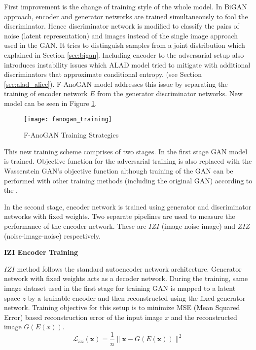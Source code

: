 First improvement is the change of training style of the whole model. In BiGAN approach,
encoder and generator networks are trained simultaneously to fool the discriminator. 
Hence discriminator network is
modified to classify the pairs of noise (latent representation) and images instead of the single
image approach used in the GAN. It tries to distinguish samples from a joint
distribution which explained in Section \ref{sec:bigan}. Including encoder to the adversarial setup
also introduces instability issues which ALAD model \cite{DBLP:journals/corr/abs-1812-02288}
tried to mitigate with additional discriminators that approximate conditional entropy. (see Section
\ref{sec:alad_alice}). F-AnoGAN model addresses this issue by separating the training of
encoder network $E$ from the generator discriminator networks. New model can be seen in Figure
\ref{fig:fanogan_training}. 
\begin{figure}[h!]
	\centering
	\texttt{[image: fanogan\_training]}
	\caption{F-AnoGAN Training Strategies \cite{pub.1111824956}}
	\label{fig:fanogan_training}
\end{figure}

This new training scheme comprises of two stages. In the first stage GAN model is trained.
Objective function for the adversarial training is also replaced with the Wasserstein GAN's
objective function \cite{Arjovsky2017WassersteinG} 
although training of the GAN can be performed with other training methods (including the
original GAN) according to the \cite{pub.1111824956}.

In the second stage, encoder network is trained using generator and discriminator networks with fixed
weights. Two separate pipelines are used to measure the performance of the encoder network. These are $IZI$
(image-noise-image) and $ZIZ$ (noise-image-noise) respectively. 

\textbf{IZI Encoder Training}

$IZI$ method follows the standard autoencoder network architecture. Generator network with fixed
weights acts as a decoder network. During the training, same image dataset used in the first stage
for training GAN is mapped to a latent space $z$ by a trainable encoder and then reconstructed
using the fixed generator network. Training objective for this setup is to minimize MSE (Mean
Squared Error) based reconstruction error of the input image $x$ and the reconstructed image
$G(E(x))$. 
\begin{equation}
	\mathcal{L}_{i z i}(\mathbf{x})=\frac{1}{n}\|\mathbf{x}-G(E(\mathbf{x}))\|^{2}
\end{equation}

